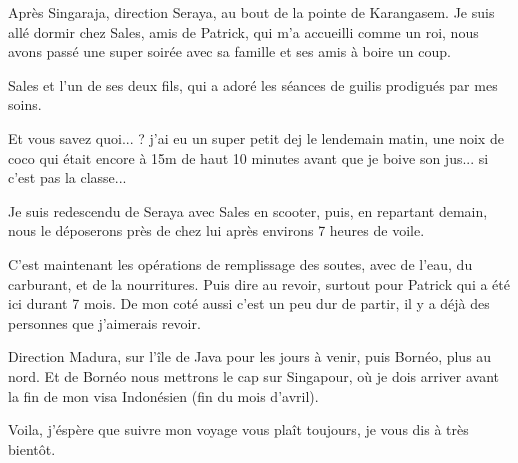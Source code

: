 \begin{multicols}{2}
Après Singaraja, direction Seraya, au bout de la pointe de Karangasem. Je suis allé dormir chez Sales, amis de Patrick, qui m'a accueilli comme un roi, nous avons passé une super soirée avec sa famille et ses amis à boire un coup.

Sales et l'un de ses deux fils, qui a adoré les séances de guilis prodigués par mes soins.


Et vous savez quoi... ? j'ai eu un super petit dej le lendemain matin, une noix de coco qui était encore à 15m de haut 10 minutes avant que je boive son jus... si c'est pas la classe...



Je suis redescendu de Seraya avec Sales en scooter, puis, en repartant demain, nous le déposerons près de chez lui après environs 7 heures de voile.

C'est maintenant les opérations de remplissage des soutes, avec de l'eau, du carburant, et de la nourritures. Puis dire au revoir, surtout pour Patrick qui a été ici durant 7 mois. De mon coté aussi c'est un peu dur de partir, il y a déjà des personnes que j'aimerais revoir.

Direction Madura, sur l'île de Java pour les jours à venir, puis Bornéo, plus au nord. Et de Bornéo nous mettrons le cap sur Singapour, où je dois arriver avant la fin de mon visa Indonésien (fin du mois d'avril).

Voila, j'éspère que suivre mon voyage vous plaît toujours, je vous dis à très bientôt.

\end{multicols}


